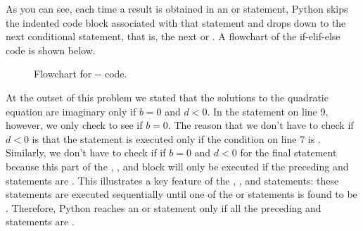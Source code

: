 \documentclass[letterpaper,10pt,english]{sphinxmanual}
\begin{document}
As you can see, each time a  result is obtained in an  or  statement, Python skips the indented code block associated with that  statement and drops down to the next conditional statement, that is, the next  or .  A flowchart of the if-elif-else code is shown below.
\begin{figure}[htbp]
\centering
\capstart

\caption{Flowchart for -- code.}\label{chap6/chap6_loopsconds:fig-flow-if-elif-else}\end{figure}

At the outset of this problem we stated that the solutions to the quadratic equation are imaginary only if $b=0$ and $d < 0$.  In the  statement on line 9, however, we only check to see if  $b=0$.  The reason that we don't have to check if $d < 0$ is that the  statement is executed only if the condition  on line 7 is .  Similarly, we don't have to check if if $b=0$ and $d < 0$ for the final  statement because this part of the , , and  block will only be executed if the preceding  and  statements are .  This illustrates a key feature of the , , and  statements: these statements are executed sequentially until one of the  or  statements is found to be .  Therefore, Python reaches an  or  statement only if all the preceding  and  statements are .
\end{document}
